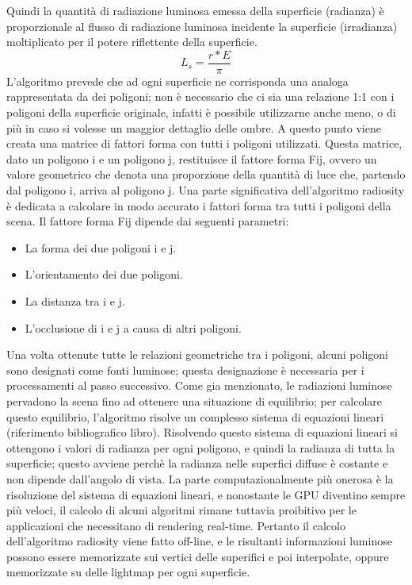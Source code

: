Quindi la quantità di radiazione luminosa emessa della superficie (radianza) è proporzionale al flusso di radiazione luminosa incidente la superficie (irradianza) moltiplicato per il potere riflettente della superficie. 
\begin{equation}
L_s = \frac{r*E}{\pi}
\end{equation}
L’algoritmo prevede che ad ogni superficie ne corrisponda una analoga rappresentata da dei poligoni; non è necessario che ci sia una relazione 1:1 con i poligoni della superficie originale, infatti è possibile utilizzarne anche meno, o di più in caso si volesse un maggior dettaglio delle ombre. 
A questo punto viene creata una matrice di fattori forma con tutti i poligoni utilizzati. Questa matrice, dato un poligono i e un poligono j, restituisce il fattore forma Fij, ovvero un valore geometrico che denota una proporzione della quantità di luce che, partendo dal poligono i, arriva al poligono j. 
Una parte significativa dell’algoritmo radiosity è dedicata a calcolare in modo accurato i fattori forma tra tutti i poligoni della scena. 
Il fattore forma Fij dipende dai seguenti parametri:
\begin{itemize}
\item La forma dei due poligoni i e j.
\item L’orientamento dei due poligoni.
\item La distanza tra i e j.
\item L’occlusione di i e j a causa di altri poligoni.
\end{itemize}
Una volta ottenute tutte le relazioni geometriche tra i poligoni, alcuni poligoni sono designati come fonti luminose; questa designazione è necessaria per i processamenti al passo successivo. 
Come gia menzionato, le radiazioni luminose pervadono la scena fino ad ottenere una situazione di equilibrio; per calcolare questo equilibrio, l’algoritmo risolve un complesso sistema di equazioni lineari (riferimento bibliografico libro).
Risolvendo questo sistema di equazioni lineari si ottengono i valori di radianza per ogni poligono, e quindi la radianza di tutta la superficie; questo avviene perchè la radianza nelle superfici diffuse è costante e non dipende dall’angolo di vista.
La parte computazionalmente più onerosa è la risoluzione del sistema di equazioni lineari, e nonostante le GPU diventino sempre più veloci, il calcolo di alcuni algoritmi rimane tuttavia proibitivo per le applicazioni che necessitano di rendering real-time. 
Pertanto il calcolo dell’algoritmo radiosity viene fatto off-line, e le risultanti informazioni luminose possono essere memorizzate sui vertici delle superifici e poi interpolate, oppure memorizzate su delle lightmap per ogni superficie. 
